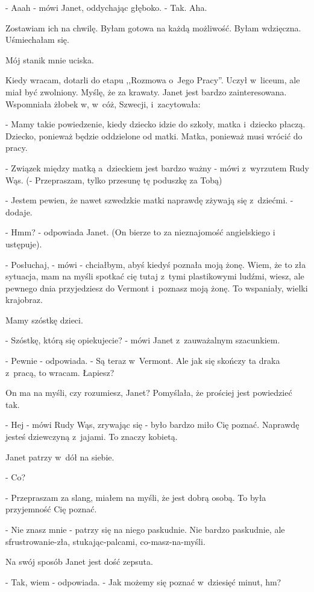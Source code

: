 \documentclass[oneside,polish,12pt,sfheadings]{mwbk}
\begin{document}
- Aaah - mówi Janet, oddychając głęboko. - Tak. Aha.

Zostawiam ich na chwilę. Byłam gotowa na każdą możliwość. Byłam wdzięczna.
Uśmiechałam się.

Mój stanik mnie uciska.

Kiedy wracam, dotarli do etapu ,,Rozmowa o~Jego Pracy''. Uczył w~liceum,
ale miał być zwolniony. Myślę, że za krawaty. Janet jest bardzo zainteresowana.
Wspomniała żłobek w, w~cóż, Szwecji, i~zacytowała: 

- Mamy takie powiedzenie,
kiedy dziecko idzie do szkoły, matka i~dziecko płaczą. Dziecko, ponieważ
będzie oddzielone od matki. Matka, ponieważ musi wrócić do pracy.

- Związek między matką a~dzieckiem jest bardzo ważny - mówi z~wyrzutem
Rudy Wąs. (- Przepraszam, tylko przesunę tę poduszkę za Tobą)

- Jestem pewien, że nawet szwedzkie matki naprawdę zżywają się z~dziećmi.
- dodaje.

- Hmm? - odpowiada Janet. (On bierze to za nieznajomość angielskiego
i ustępuje).

- Posłuchaj, - mówi - chciałbym, abyś kiedyś poznała moją żonę. Wiem,
że to zła sytuacja, mam na myśli spotkać cię tutaj z~tymi plastikowymi
ludźmi, wiesz, ale pewnego dnia przyjedziesz do Vermont i~poznasz
moją żonę. To wspaniały, wielki krajobraz.

Mamy szóstkę dzieci.

- Szóstkę, którą się opiekujecie? - mówi Janet z~zauważalnym szacunkiem.

- Pewnie - odpowiada. - Są teraz w~Vermont. Ale jak się skończy ta
draka z~pracą, to wracam. Łapiesz?

On ma na myśli, czy rozumiesz, Janet? Pomyślała, że prościej jest
powiedzieć tak.

- Hej - mówi Rudy Wąs, zrywając się - było bardzo miło Cię poznać.
Naprawdę jesteś dziewczyną z~jajami. To znaczy kobietą.

Janet patrzy w~dół na siebie. 

- Co?

- Przepraszam za slang, miałem na myśli, że jest dobrą osobą. To była
przyjemność Cię poznać.

- Nie znasz mnie - patrzy się na niego paskudnie. Nie bardzo paskudnie,
ale sfrustrowanie-zła, stukając-palcami, co-masz-na-myśli.

Na swój sposób Janet jest dość zepsuta.

- Tak, wiem - odpowiada. - Jak możemy się poznać w~dziesięć minut,
hm?
\end{document}
